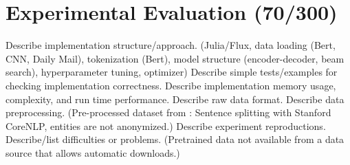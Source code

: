 \section{Experimental Evaluation (70/300)}

Describe implementation structure/approach. (Julia/Flux, data loading (Bert, CNN, Daily Mail), tokenization (Bert), model structure (encoder-decoder, beam search), hyperparameter tuning, optimizer)
Describe simple tests/examples for checking implementation correctness.
Describe implementation memory usage, complexity, and run time performance.
Describe raw data format.
Describe data preprocessing. (Pre-processed dataset from \citeauthor{LiuL2019}: Sentence splitting  with Stanford CoreNLP, entities are not anonymized.)
Describe experiment reproductions.
Describe/list difficulties or problems. (Pretrained data not available from a data source that allows automatic downloads.)
